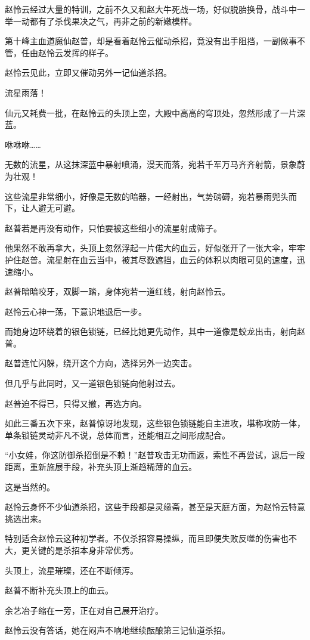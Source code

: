 \begin{this_body}
赵怜云经过大量的特训，之前不久又和赵大牛死战一场，好似脱胎换骨，战斗中一举一动都有了杀伐果决之气，再非之前的新嫩模样。

第十峰主血道魔仙赵普，却是看着赵怜云催动杀招，竟没有出手阻挡，一副做事不管，任由赵怜云发挥的样子。

赵怜云见此，立即又催动另外一记仙道杀招。

流星雨落！

仙元又耗费一批，在赵怜云的头顶上空，大殿中高高的穹顶处，忽然形成了一片深蓝。

咻咻咻……

无数的流星，从这抹深蓝中暴射喷涌，漫天而落，宛若千军万马齐齐射箭，景象蔚为壮观！

这些流星非常细小，好像是无数的暗器，一经射出，气势磅礴，宛若暴雨兜头而下，让人避无可避。

赵普若是再没有动作，只怕要被这些细小的流星射成筛子。

他果然不敢再拿大，头顶上忽然浮起一片偌大的血云，好似张开了一张大伞，牢牢护住赵普。流星射在血云当中，被其尽数遮挡，血云的体积以肉眼可见的速度，迅速缩小。

赵普暗暗咬牙，双脚一踏，身体宛若一道红线，射向赵怜云。

赵怜云心神一荡，下意识地退后一步。

而她身边环绕着的银色锁链，已经比她更先动作，其中一道像是蛟龙出击，射向赵普。

赵普连忙闪躲，绕开这个方向，选择另外一边突击。

但几乎与此同时，又一道银色锁链向他射过去。

赵普迫不得已，只得又撤，再选方向。

如此三番五次下来，赵普惊讶地发现，这些银色锁链能自主进攻，堪称攻防一体，单条锁链灵动非凡不说，总体而言，还能相互之间形成配合。

“小女娃，你这防御杀招倒是不赖！”赵普攻击无功而返，索性不再尝试，退后一段距离，重新施展手段，补充头顶上渐趋稀薄的血云。

这是当然的。

赵怜云身怀不少仙道杀招，这些手段都是灵缘斋，甚至是天庭方面，为赵怜云特意挑选出来。

特别适合赵怜云这种初学者。不仅杀招容易操纵，而且即便失败反噬的伤害也不大，更关键的是杀招本身非常优秀。

头顶上，流星璀璨，还在不断倾泻。

赵普不断补充头顶上的血云。

余艺冶子缩在一旁，正在对自己展开治疗。

赵怜云没有答话，她在闷声不响地继续酝酿第三记仙道杀招。


\end{this_body}
